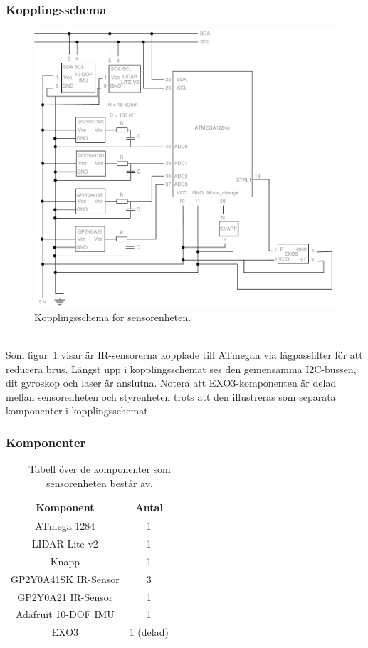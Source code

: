 \documentclass{article}
\begin{document}
\subsubsection{Kopplingsschema}
\begin{figure}[H]
\centering
\includegraphics[scale=0.45]{Sensorenhet_kopplingsschema}
\caption{Kopplingsschema för sensorenheten.}
\label{fig:sensorenhet_kopplingsschema}
\end{figure}
\ \\
Som figur~\ref{fig:sensorenhet_kopplingsschema} visar är IR-sensorerna kopplade till ATmegan via lågpassfilter för att reducera brus. Längst upp i kopplingsschemat ses den gemensamma I2C-bussen, dit gyroskop och laser är anslutna. Notera att EXO3-komponenten är delad mellan sensorenheten och styrenheten trots att den illustreras som separata komponenter i kopplingsschemat.

\subsubsection{Komponenter}

\begin{table}[H]
  \centering
  \begin{tabular}{ | c | c | c | c |}
    \hline
    \textbf{Komponent} & \textbf{Antal} \\
    \hline
    ATmega 1284 & 1 \\
    \hline
    LIDAR-Lite v2 & 1 \\
    \hline
    Knapp & 1 \\
    \hline
    GP2Y0A41SK IR-Sensor & 3 \\
    \hline
    GP2Y0A21 IR-Sensor & 1 \\
    \hline
    Adafruit 10-DOF IMU & 1 \\
    \hline
    EXO3 & 1 (delad) \\
    \hline
  \end{tabular}
  \caption{ Tabell över de komponenter som sensorenheten består av. }
\end{table}
\end{document}
